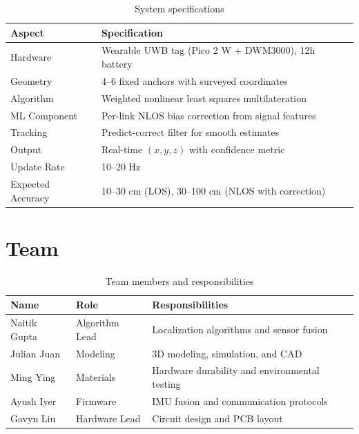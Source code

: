 \documentclass[11pt,a4paper]{article}
\begin{document}
\begin{table}[H]
\centering
\begin{tabular}{@{}ll@{}}
\toprule
\textbf{Aspect} & \textbf{Specification} \\
\midrule
Hardware & Wearable UWB tag (Pico 2 W + DWM3000), 12h battery \\
Geometry & 4--6 fixed anchors with surveyed coordinates \\
Algorithm & Weighted nonlinear least squares multilateration \\
ML Component & Per-link NLOS bias correction from signal features \\
Tracking & Predict-correct filter for smooth estimates \\
Output & Real-time $(x, y, z)$ with confidence metric \\
Update Rate & 10--20 Hz \\
Expected Accuracy & 10--30 cm (LOS), 30--100 cm (NLOS with correction) \\
\bottomrule
\end{tabular}
\caption{System specifications}
\end{table}

\section{Team}

\begin{table}[H]
\centering
\begin{tabular}{@{}lll@{}}
\toprule
\textbf{Name} & \textbf{Role} & \textbf{Responsibilities} \\
\midrule
Naitik Gupta & Algorithm Lead & Localization algorithms and sensor fusion \\
Julian Juan & Modeling & 3D modeling, simulation, and CAD \\
Ming Ying & Materials & Hardware durability and environmental testing \\
Ayush Iyer & Firmware & IMU fusion and communication protocols \\
Gavyn Liu & Hardware Lead & Circuit design and PCB layout \\
\bottomrule
\end{tabular}
\caption{Team members and responsibilities}
\end{table}

\end{document}
